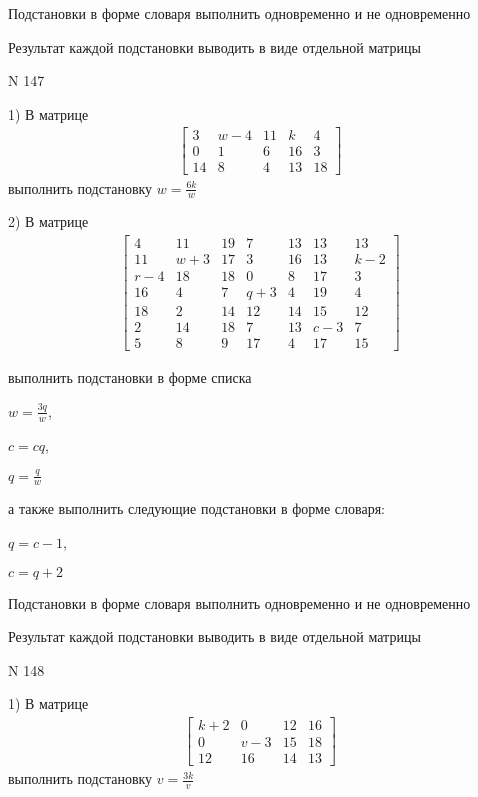 \documentclass[11pt]{report}
\begin{document}
    Подстановки в форме словаря выполнить одновременно и не одновременно


    Результат каждой подстановки выводить в виде отдельной матрицы

\newpage
N 147


    1) В матрице
\begin{align*}
\left[\begin{matrix}3 & w - 4 & 11 & k & 4\\0 & 1 & 6 & 16 & 3\\14 & 8 & 4 & 13 & 18\end{matrix}\right]
\end{align*}
выполнить подстановку $w=\frac{6 k}{w}$


    2) В матрице
\begin{align*}
\left[\begin{matrix}4 & 11 & 19 & 7 & 13 & 13 & 13\\11 & w + 3 & 17 & 3 & 16 & 13 & k - 2\\r - 4 & 18 & 18 & 0 & 8 & 17 & 3\\16 & 4 & 7 & q + 3 & 4 & 19 & 4\\18 & 2 & 14 & 12 & 14 & 15 & 12\\2 & 14 & 18 & 7 & 13 & c - 3 & 7\\5 & 8 & 9 & 17 & 4 & 17 & 15\end{matrix}\right]
\end{align*}

выполнить подстановки в форме списка

$w=\frac{3 q}{w}$,

$c=c q$,

$q=\frac{q}{w}$

а также выполнить следующие подстановки в форме словаря:

$q=c - 1$,

$c=q + 2$


    Подстановки в форме словаря выполнить одновременно и не одновременно


    Результат каждой подстановки выводить в виде отдельной матрицы

\newpage
N 148


    1) В матрице
\begin{align*}
\left[\begin{matrix}k + 2 & 0 & 12 & 16\\0 & v - 3 & 15 & 18\\12 & 16 & 14 & 13\end{matrix}\right]
\end{align*}
выполнить подстановку $v=\frac{3 k}{v}$
\end{document}
